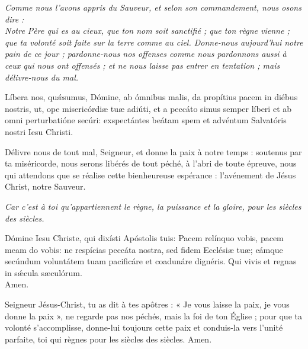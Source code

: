 \documentclass[twoside]{article}
\begin{document}

\emph{\vv Comme nous l'avons appris du Sauveur, et selon son commandement, nous osons dire :\\
\rr Notre Père qui es au cieux, que ton nom soit sanctifié ; que ton règne vienne ; que ta volonté soit faite sur la terre comme au ciel. Donne-nous aujourd'hui notre pain de ce jour ; pardonne-nous nos offenses comme nous pardonnons aussi à ceux qui nous ont offensés ; et ne nous laisse pas entrer en tentation ; mais délivre-nous du mal.}

\begin{paracol}{2}
Líbera nos, quǽsumus, Dómine, ab ómnibus malis,
da propítius pacem in diébus nostris,
ut, ope misericórdiæ tuæ adiúti,
et a peccáto simus semper líberi
et ab omni perturbatióne secúri:
exspectántes beátam spem
et advéntum Salvatóris nostri Iesu Christi.

\switchcolumn

Délivre nous de tout mal, Seigneur,
et donne la paix à notre temps :
soutenus par ta miséricorde,
nous serons libérés de tout péché,
à l’abri de toute épreuve,
nous qui attendons que se réalise
cette bienheureuse espérance :  
l’avénement de Jésus Christ, notre Sauveur.

\end{paracol}

\emph{\rr Car c'est à toi qu'appartiennent le règne, la puissance et la gloire, pour les siècles des siècles.}

\begin{paracol}{2}

Dómine Iesu Christe, qui dixísti Apóstolis tuis:
Pacem relínquo vobis, pacem meam do vobis:
ne respícias peccáta nostra,
sed fidem Ecclésiæ tuæ;
eámque secúndum voluntátem tuam
pacificáre et coadunáre dignéris.
Qui vivis et regnas in sǽcula sæculórum.\\
\rr Amen. 

\switchcolumn

Seigneur Jésus-Christ, tu as dit à tes apôtres : « Je vous laisse la paix, je vous donne la paix », ne regarde pas nos péchés, mais la foi de ton Église ; pour que ta volonté s'accomplisse, donne-lui toujours cette paix et conduis-la vers l'unité parfaite, toi qui règnes pour les siècles des siècles. 
\rr Amen.

\end{paracol}

\end{document}

